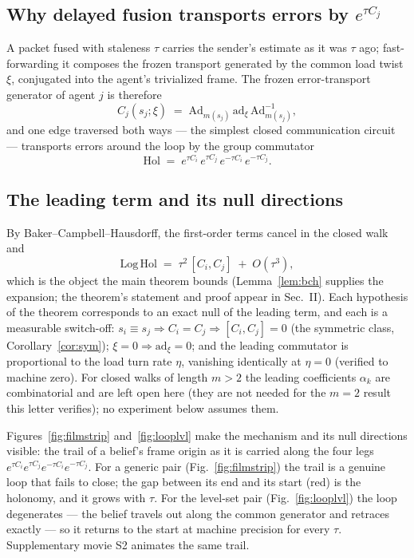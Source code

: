 \documentclass[letterpaper, 10pt, journal]{IEEEtran}
\begin{document}
\subsection{Why delayed fusion transports errors by $e^{\tau C_j}$}
A packet fused with staleness $\tau$ carries the sender's estimate as it was
$\tau$ ago; fast-forwarding it composes the frozen transport generated by the
common load twist $\xi$, conjugated into the agent's trivialized frame. The
frozen error-transport generator of agent $j$ is therefore
\begin{equation}
C_j(s_j;\xi) \;=\; \mathrm{Ad}_{m(s_j)}\, \mathrm{ad}_\xi\,
\mathrm{Ad}_{m(s_j)}^{-1},
\end{equation}
and one edge traversed both ways --- the simplest closed communication
circuit --- transports errors around the loop by the group commutator
\begin{equation}
\mathrm{Hol} \;=\; e^{\tau C_i}\, e^{\tau C_j}\, e^{-\tau C_i}\,
e^{-\tau C_j}.
\end{equation}

\subsection{The leading term and its null directions}
By Baker--Campbell--Hausdorff, the first-order terms cancel in the closed
walk and
\begin{equation}
\mathrm{Log\,Hol} \;=\; \tau^2\,[C_i, C_j] \;+\; O(\tau^3),
\end{equation}
which is the object the main theorem bounds (Lemma~\ref{lem:bch} supplies
the expansion; the theorem's statement and proof appear in Sec.~II). Each
hypothesis of the theorem corresponds to an exact null of the leading term,
and each is a measurable switch-off:
$s_i \equiv s_j \Rightarrow C_i = C_j \Rightarrow [C_i, C_j] = 0$ (the
symmetric class, Corollary~\ref{cor:sym}); $\xi = 0 \Rightarrow
\mathrm{ad}_\xi = 0$; and
the leading commutator is proportional to the load turn rate $\eta$, vanishing
identically at $\eta = 0$ (verified to machine zero). For closed walks of
length $m > 2$ the leading coefficients $\alpha_k$ are combinatorial and are
left open here (they are not needed for the $m{=}2$ result this letter
verifies); no experiment below assumes them.

Figures~\ref{fig:filmstrip} and~\ref{fig:looplvl} make the mechanism and its
null directions visible: the trail of a belief's frame origin as it is carried
along the four legs $e^{\tau C_i}e^{\tau C_j}e^{-\tau C_i}e^{-\tau C_j}$. For a
generic pair (Fig.~\ref{fig:filmstrip}) the trail is a genuine loop that fails
to close; the gap between its end and its start (red) is the holonomy, and it
grows with $\tau$. For the level-set pair (Fig.~\ref{fig:looplvl}) the loop
degenerates --- the belief travels out along the common generator and retraces
exactly --- so it returns to the start at machine precision for every $\tau$.
Supplementary movie S2 animates the same trail.
\end{document}
